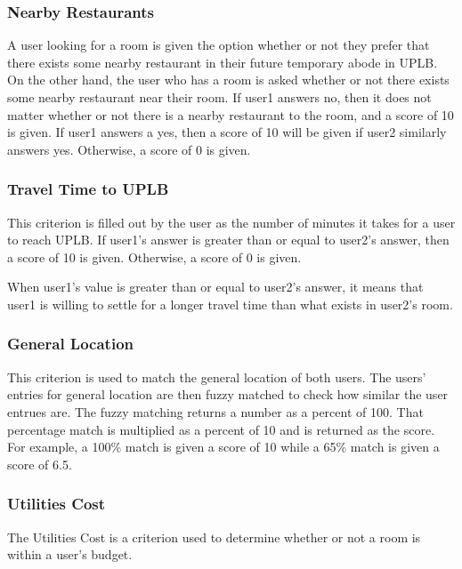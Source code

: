 \documentclass[journal]{IEEEtran}
\begin{document}
    \subsubsection{Nearby Restaurants}
        A user looking for a room is given the option whether or not they prefer that there exists some nearby
        restaurant in their future temporary abode in UPLB. On the other hand, the user who has a room is asked whether
        or not there exists some nearby restaurant near their room. If user1 answers no, then it does not matter whether
        or not there is a nearby restaurant to the room, and a score of 10 is given. If user1 answers a yes, then a
        score of 10 will be given if user2 similarly answers yes. Otherwise, a score of 0 is given.

    \subsubsection{Travel Time to UPLB}
        This criterion is filled out by the user as the number of minutes it takes for a user to reach UPLB.
        If user1's answer is greater than or equal to user2's answer, then a score of 10 is given. Otherwise, a score of
        0 is given. 

        When user1's value is greater than or equal to user2's answer, it means that user1 is willing to settle for a
        longer travel time than what exists in user2's room.

    \subsubsection{General Location}
        This criterion is used to match the general location of both users. The users' entries for general location are
        then fuzzy matched to check how similar the user entrues are. The fuzzy matching returns a number as a percent
        of 100. That percentage match is multiplied as a percent of 10 and is returned as the score. For example, a 100\% match is
        given a score of 10 while a 65\% match is given a score of 6.5.

    \subsubsection{Utilities Cost}
        The Utilities Cost is a criterion used to determine whether or not a room is within a user's budget.
\end{document}
